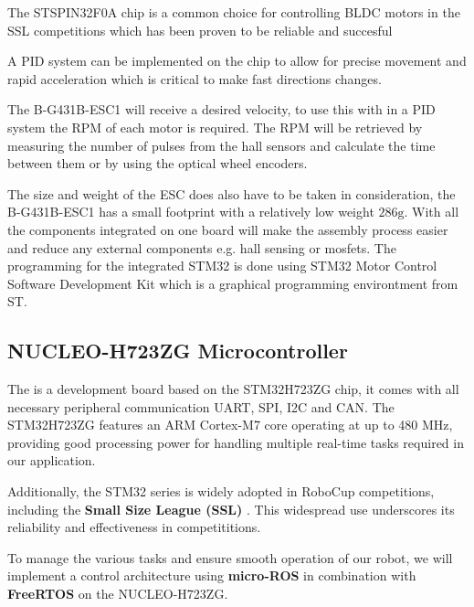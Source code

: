 \documentclass[a4paper,12pt]{article}
\begin{document}
  The STSPIN32F0A chip is a common choice for controlling BLDC motors in
  the SSL competitions which has been proven to be reliable and
  succesful
  \cite{ryllExtendedTeamDescription}\cite{abousaleh2024TeamDescription}

  A PID system can be implemented on the chip to allow for precise
  movement and rapid acceleration which is critical to make fast
  directions changes.

  The B-G431B-ESC1 will receive a desired velocity, to use this with in
  a PID system the RPM of each motor is required. The RPM will be
  retrieved by measuring the number of pulses from the hall sensors and
  calculate the time between them or by using the optical wheel
  encoders.

  The size and weight of the ESC does also have to be taken in
  consideration, the B-G431B-ESC1 has a small footprint with a
  relatively low weight $286\text{g}$. With all the components
  integrated on one board will make the assembly process easier and
  reduce any external components e.g. hall sensing or mosfets. The
  programming for the integrated STM32 is done using STM32 Motor Control
  Software Development Kit which is a graphical programming environtment
  from ST.

  \subsection*{NUCLEO-H723ZG Microcontroller}

  The  is a development board based on the
  STM32H723ZG chip, it comes with all necessary peripheral communication
  UART, SPI, I2C and CAN. The STM32H723ZG features an ARM Cortex-M7 core
  operating at up to 480 MHz, providing good processing power for
  handling multiple real-time tasks required in our application.

  Additionally, the STM32 series is widely adopted in RoboCup
  competitions, including the \textbf{Small Size League (SSL)} \cite{ryllExtendedTeamDescription}\cite{zhaoZJUNlictExtendedTeam}\cite{wuCompilationErrorTeam}.
  This widespread use underscores its reliability and effectiveness in
  competititions.

  To manage the various tasks and ensure smooth operation of our robot,
  we will implement a control architecture using \textbf{micro-ROS} in
  combination with \textbf{FreeRTOS} on the NUCLEO-H723ZG.
\end{document}
